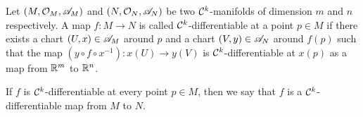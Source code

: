 \begin{definition}[Differentiability]
	Let \((M, \mathcal{O}_M, \mathscr{A}_M)\) and \((N, \mathcal{O}_N, \mathscr{A}_N)\) be two \(\mathcal C^{k}\)-manifolds of dimension \(m\) and \(n\) respectively. A map \(f: M \to N\) is called \(\mathcal C^{k}\)-differentiable at a point \(p \in M\) if there exists a chart \((U, x) \in \mathscr{A}_M\) around \(p\) and a chart \((V, y) \in \mathscr{A}_N\) around \(f(p)\) such that the map \((y \circ f \circ x^{-1}): x(U) \to y(V)\) is \(\mathcal C^{k}\)-differentiable at \(x(p)\) as a map from \(\mathbb R^m\) to \(\mathbb R^n\).
	\begin{figure}[H]
		\centering
	\end{figure}
	If \(f\) is \(\mathcal C^{k}\)-differentiable at every point \(p \in M\), then we say that \(f\) is a \(\mathcal C^{k}\)-differentiable map from \(M\) to \(N\).
\end{definition}


